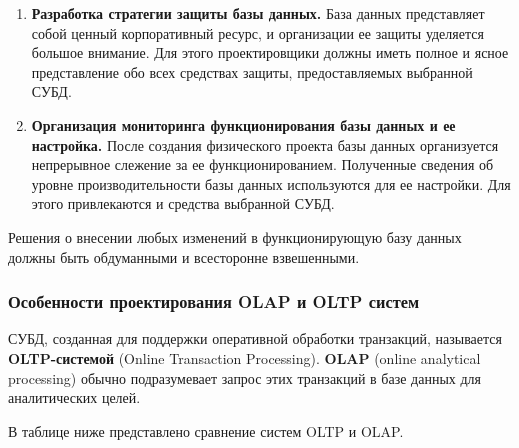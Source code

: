 \begin{enumerate}
	При этом стоит понимать, что индексы занимают место в БД. При вводе новых данных или удалении
	данных СУБД приходится обновлять и таблицы, и индексы. Это может
	замедлить выполнение операций модификации данных, особенно для таблиц
	с большим числом строк, как в хранилище данных. Таким образом, может появиться
	проблема, суть которой состоит в возникновении конфликта между
	скоростью обновления данных в таблице и скоростью ее считываний. При
	разрешении этой проблемы следует придерживаться следующего
	эмпирического правила: создавать индексы для колонок первичных ключей и
	других колонок, часто используемых в тех запросах, в которых для выборки
	данных применяются логические критерии. Если в результате скорость
	обновления данных ухудшается, то можно рассмотреть вопрос об удалении
	некоторых индексов.
        
    \item \textbf{Разработка стратегии защиты базы данных.}
        База данных представляет собой ценный корпоративный ресурс, и организации ее защиты уделяется большое
        внимание. Для этого проектировщики должны иметь полное и ясное представление обо всех средствах защиты,
        предоставляемых выбранной СУБД.

    \item \textbf{Организация мониторинга функционирования базы данных и ее настройка.}
        После создания физического проекта базы данных организуется непрерывное слежение за ее функционированием.
        Полученные сведения об уровне производительности базы данных используются для ее настройки. Для этого
        привлекаются и средства выбранной СУБД.
\end{enumerate}

Решения о внесении любых изменений в функционирующую базу данных должны быть обдуманными и всесторонне взвешенными.
\subsubsection{Особенности проектирования OLAP и OLTP систем}

СУБД, созданная для поддержки оперативной обработки транзакций,
называется \textbf{OLTP-системой} (Online Transaction Processing). \textbf{OLAP} (online analytical processing) обычно подразумевает запрос этих транзакций в базе данных для аналитических целей. 

В таблице ниже представлено сравнение систем OLTP и OLAP\autocite{oracle_OLTP}.

